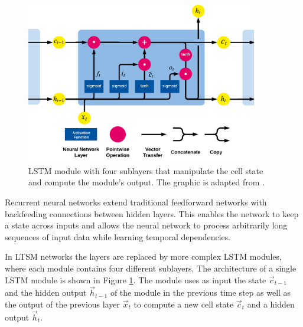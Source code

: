 \begin{figure}[htbp!]
	\centering
	\includegraphics[width=0.9\textwidth]{figures/lstm-module}
	\caption[Structure of an LSTM module]{LSTM module with four sublayers that manipulate the cell state and compute the module's output. The graphic is adapted from \cite{lstm-blog}.}
	\label{fig:lstm-module}
\end{figure}

Recurrent neural networks extend traditional feedforward networks with backfeeding connections between hidden layers.
This enables the network to keep a state across inputs and allows the neural network to process arbitrarily long sequences of input data while learning temporal dependencies.

In LTSM networks the layers are replaced by more complex LSTM modules, where each module contains four different sublayers.
The architecture of a single LSTM module is shown in Figure \ref{fig:lstm-module}.
The module uses as input the state $\vec{c}_{t-1}$ and the hidden output $\vec{h}_{t-1}$ of the module in the previous time step as well as the output of the previous layer $\vec{x}_t$ to compute a new cell state $\vec{c}_{t}$ and a hidden output $\vec{h}_{t}$.

